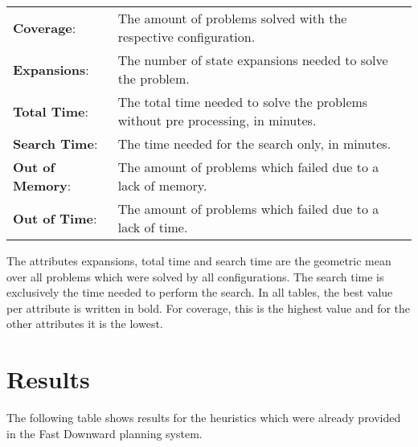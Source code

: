 \begin{center}
    \begin{tabularx}{\textwidth}{@{}lX@{}}
        \textbf{Coverage}: & The amount of problems solved with the respective configuration. \\
        \textbf{Expansions}: & The number of state expansions needed to solve the problem. \\
        \textbf{Total Time}: & The total time needed to solve the problems without pre processing, in minutes. \\
        \textbf{Search Time}: & The time needed for the search only, in minutes. \\
        \textbf{Out of Memory}: & The amount of problems which failed due to a lack of memory. \\
        \textbf{Out of Time}: & The amount of problems which failed due to a lack of time. \\
    \end{tabularx}
\end{center}

The attributes expansions, total time and search time are the geometric mean over all problems which were solved by all configurations.
The search time is exclusively the time needed to perform the search.
In all tables, the best value per attribute is written in bold.
For coverage, this is the highest value and for the other attributes it is the lowest.

\section{Results}\label{sec:results}
The following table shows results for the heuristics which were already provided in the Fast Downward planning system.

